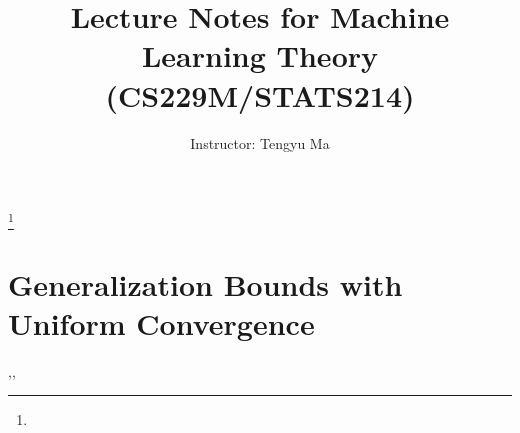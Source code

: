 \documentclass{book}
\theoremstyle{definition}
\theoremstyle{remark}
\numberwithin{section}{chapter}
\numberwithin{equation}{chapter}
\begin{document}
\frontmatter

\title{Lecture Notes for Machine Learning Theory (CS229M/STATS214)}


\author{Instructor: Tengyu Ma}
\thanks{}






\maketitle


\setcounter{page}{4}

\tableofcontents

%
\mainmatter
\let\sec\section
\let\subsec\subsection

\chapter{Generalization Bounds with Uniform Convergence}



%
,,
\appendix


\backmatter


\end{document}
